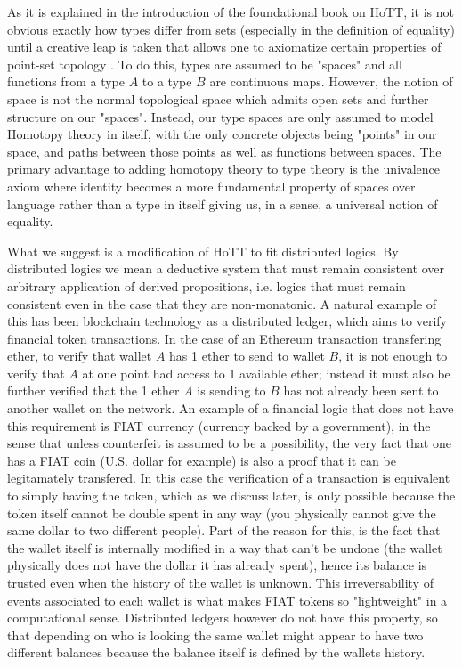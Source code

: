 \documentclass[12pt]{amsart}
\begin{document}
As it is explained in the introduction of the foundational book on HoTT, it is not obvious exactly how types differ from sets (especially in the definition of equality) until a creative leap is taken that allows one to axiomatize certain properties of point-set topology \cite{HoTT}. To do this, types are assumed to be "spaces" and all functions from a type $A$ to a type $B$ are continuous maps. However, the notion of space is not the normal topological space which admits open sets and further structure on our "spaces". Instead, our type spaces are only assumed to model Homotopy theory in itself, with the only concrete objects being "points" in our space, and paths between those points as well as functions between spaces. The primary advantage to adding homotopy theory to type theory is the univalence axiom where identity becomes a more fundamental property of spaces over language rather than a type in itself giving us, in a sense, a universal notion of equality. \newline

What we suggest is a modification of HoTT to fit distributed logics. By distributed logics we mean a deductive system that must remain consistent over arbitrary application of derived propositions, i.e. logics that must remain consistent even in the case that they are non-monatonic. A natural example of this has been blockchain technology as a distributed ledger, which aims to verify financial token transactions. In the case of an Ethereum transaction transfering ether, to verify that wallet $A$ has 1 ether to send to wallet $B$, it is not enough to verify that $A$ at one point had access to 1 available ether; instead it must also be further verified that the 1 ether $A$ is sending to $B$ has not already been sent to another wallet on the network. An example of a financial logic that does not have this requirement is FIAT currency (currency backed by a government), in the sense that unless counterfeit is assumed to be a possibility, the very fact that one has a FIAT coin (U.S. dollar for example) is also a proof that it can be legitamately transfered. In this case the verification of a transaction is equivalent to simply having the token, which as we discuss later, is only possible because the token itself cannot be double spent in any way (you physically cannot give the same dollar to two different people). Part of the reason for this, is the fact that the wallet itself is internally modified in a way that can't be undone (the wallet physically does not have the dollar it has already spent), hence its balance is trusted even when the history of the wallet is unknown. This irreversability of events associated to each wallet is what makes FIAT tokens so "lightweight" in a computational sense. Distributed ledgers however do not have this property, so that depending on who is looking the same wallet might appear to have two different balances because the balance itself is defined by the wallets history. \newline
\end{document}
